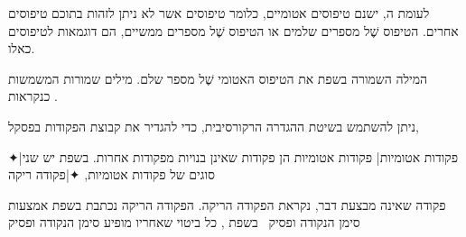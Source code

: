 {לעומת ה, ישנם טיפוסים אטומיים, כלומר
טיפוסים אשר לא ניתן לזהות בתוכם טיפוסים אחרים. הטיפוס שֶׁל מספרים שלמים או
הטיפוס שֶׁל מספרים ממשיים, הם דוגמאות לטיפוסים כאלו.

המילה השמורה  בשפת   את הטיפוס האטומי שֶׁל מספר שלם.
מילים
שמורות המשמשות כ נקראות .

ניתן להשתמש בשיטת ההגדרה הרקורסיבית, כדי להגדיר את קבוצת הפקודות בפסקל,

✦\ע|פקודות אטומיות| פקודות אטומיות הן פקודות שאינן בנויות מפקודות אחרות. בשפת  יש שני סוגים של פקודות אטומיות,
✦\ע|פקודה ריקה} פקודה שאינה מבצעת דבר, נקראת הפקודה הריקה. הפקודה הריקה נכתבת בשפת אמצעות סימן הנקודה ופסיק~ בשפת , כל ביטוי שאחריו מופיע סימן הנקודה ופסיק~
